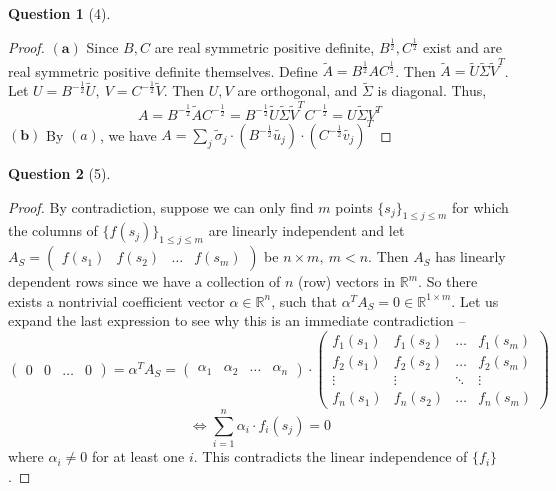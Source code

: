\documentclass[11pt]{article}
\theoremstyle{quest}
\newtheorem*{question}{Question}
\begin{document}
\begin{question}[4]
\end{question}
\begin{proof}
$\mathbf{(a)}$ Since $B, C$ are real symmetric positive definite, $B^{\frac{1}{2}}, C^{\frac{1}{2}}$ exist and are real symmetric positive definite themselves. Define $\tilde{A} = B^{\frac{1}{2}} A C^{\frac{1}{2}}$. Then $\tilde{A} = \tilde{U}  \tilde{\Sigma} \tilde{V}^T$. Let $U = B^{-\frac{1}{2}} \tilde{U},\ V = C^{-\frac{1}{2}} \tilde{V}$. Then $U, V$ are orthogonal, and $\tilde{\Sigma}$ is diagonal. Thus,
$$A = B^{-\frac{1}{2}} \tilde{A} C^{-\frac{1}{2}} = B^{-\frac{1}{2}} \tilde{U}  \tilde{\Sigma} \tilde{V}^T C^{-\frac{1}{2}} = U \tilde{\Sigma} V^T$$
$\mathbf{(b)}$ By $(a)$, we have $A = \sum_j \tilde{\sigma}_j \cdot (B^{-\frac{1}{2}} \tilde{u_j}) \cdot (C^{-\frac{1}{2}} \tilde{v_j})^T$
\end{proof}

\begin{question}[5]
\end{question}
\begin{proof}
By contradiction, suppose we can only find $m$ points $\{s_j\}_{1 \le j \le m}$ for which the columns of $\{f(s_j)\}_{1 \le j \le m}$ are linearly independent and let $A_S = \begin{pmatrix}
f(s_1) & f(s_2) & \ldots & f(s_m)
\end{pmatrix}$ be $n \times m,\ m < n$. Then $A_S$ has linearly dependent rows since we have a collection of $n$ (row) vectors in $\mathbb{R}^m$. So there exists a nontrivial coefficient vector $\alpha \in \mathbb{R}^n$, such that $\alpha^T A_S = 0 \in \mathbb{R}^{1 \times m}$. Let us expand the last expression to see why this is an immediate contradiction --
$$\begin{pmatrix}
0 & 0 & \ldots & 0
\end{pmatrix} = \alpha^T A_S = \begin{pmatrix}
\alpha_1 & \alpha_2 & \ldots & \alpha_n
\end{pmatrix} \cdot \begin{pmatrix}
f_1(s_1) & f_1(s_2) & \ldots & f_1(s_m) \\
f_2(s_1) & f_2(s_2) & \ldots & f_2(s_m) \\
\vdots & \vdots & \ddots & \vdots \\
f_n(s_1) & f_n(s_2) & \ldots & f_n(s_m)
\end{pmatrix} $$
$$\iff \sum_{i=1}^n \alpha_i \cdot f_i(s_j) = 0$$
where $\alpha_i \ne 0$ for at least one $i$. This contradicts the linear independence of $\{f_i\}$.
\end{proof}
\end{document}
